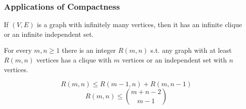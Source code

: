\documentclass[UTF8,aspectratio=43,11pt,colorlinks,compress,openany]{beamer}%
\begin{document}
\begin{frame}\frametitle{Applications of Compactness}
	\begin{theorem}
		If $(V,E)$ is a graph with infinitely many vertices, then it has an infinite clique or an infinite independent set.
	\end{theorem}
	\begin{theorem}
		For every $m,n\geq 1$ there is an integer $R(m,n)$ s.t. any graph with at least $R(m,n)$ vertices has a clique with $m$ vertices or an independent set with $n$ vertices.
	\end{theorem}
	\vspace{-2ex}
	\[R(m,n)\leq R(m-1,n)+R(m,n-1)\]
	\[R(m,n)\leq \binom{m+n-2}{m-1}\]
\end{frame}
\end{document}
